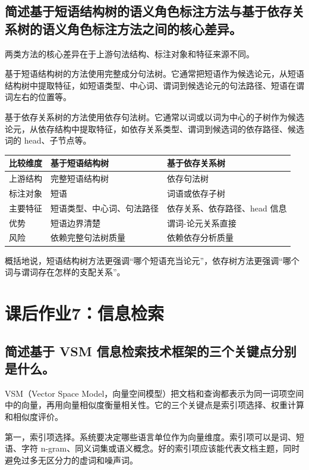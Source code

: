 \subsection{简述基于短语结构树的语义角色标注方法与基于依存关系树的语义角色标注方法之间的核心差异。}

两类方法的核心差异在于上游句法结构、标注对象和特征来源不同。

基于短语结构树的方法使用完整成分句法树。它通常把短语作为候选论元，从短语结构树中提取特征，如短语类型、中心词、谓词到候选论元的句法路径、短语在谓词左右的位置等。

基于依存关系树的方法使用依存句法树。它通常以词或以词为中心的子树作为候选论元，从依存结构中提取特征，如依存关系类型、谓词到候选词的依存路径、候选词的 head、子节点等。

\begin{table}[H]
\centering
\small
\begin{tabular}{|l|l|l|}
\hline
比较维度 & 基于短语结构树 & 基于依存关系树 \\ \hline
上游结构 & 完整短语结构树 & 依存句法树 \\ \hline
标注对象 & 短语 & 词语或依存子树 \\ \hline
主要特征 & 短语类型、中心词、句法路径 & 依存关系、依存路径、head 信息 \\ \hline
优势 & 短语边界清楚 & 谓词-论元关系直接 \\ \hline
风险 & 依赖完整句法树质量 & 依赖依存分析质量 \\ \hline
\end{tabular}
\end{table}

概括地说，短语结构树方法更强调“哪个短语充当论元”，依存树方法更强调“哪个词与谓词存在怎样的支配关系”。

\section{课后作业7：信息检索}

\subsection{简述基于 VSM 信息检索技术框架的三个关键点分别是什么。}

VSM（Vector Space Model，向量空间模型）把文档和查询都表示为同一词项空间中的向量，再用向量相似度衡量相关性。它的三个关键点是索引项选择、权重计算和相似度评价。

第一，索引项选择。系统要决定哪些语言单位作为向量维度。索引项可以是词、短语、字符 n-gram、同义词集或语义概念。好的索引项应该能代表文档主题，同时避免过多无区分力的虚词和噪声词。

